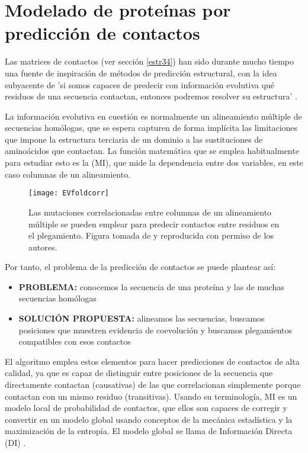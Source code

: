 \section{Modelado de prote\'{i}nas por predicci\'{o}n de contactos} \label{contactosPred}

Las matrices de contactos (ver secci\'{o}n \ref{estr34})  han sido durante mucho tiempo una fuente de inspiraci\'{o}n de m\'{e}todos 
de predicci\'{o}n estructural, con la idea subyacente de 'si somos capaces de predecir con informaci\'{o}n evolutiva qu\'{e} residuos de 
una secuencia contactan, entonces podremos resolver su estructura' \citep{Gobel1994,deJuan2013}.

La informaci\'{o}n evolutiva en cuesti\'{o}n es normalmente un alineamiento m\'{u}ltiple de secuencias hom\'{o}logas, que se espera
capturen de forma impl\'{i}cita las limitaciones que impone la estructura terciaria de un dominio a las sustituciones de amino\'{a}cidos
que contactan. La funci\'{o}n matem\'{a}tica que se emplea habitualmente para estudiar esto es la 
 (MI), 
que mide la dependencia entre dos variables, en este caso columnas de un alineamiento.

\begin{figure}
\begin{center} 
\texttt{[image: EVfoldcorr]}
\caption%
{
Las mutaciones correlacionadas entre columnas de un alineamiento m\'{u}ltiple se pueden emplear para predecir contactos entre residuos en el plegamiento.
Figura tomada de \cite{Marks2011} y reproducida con permiso de los autores.
}
\label{fig:EVfold1}
\end{center}
\end{figure}

Por tanto, el problema de la predicci\'{o}n de contactos se puede plantear as\'{i}:
\begin{itemize}
\item \textbf{PROBLEMA:} conocemos la secuencia de una prote\'{i}na y las de muchas secuencias hom\'{o}logas
\item \textbf{SOLUCI\'{O}N PROPUESTA:} alineamos las secuencias, buscamos posiciones que muestren evidencia de coevoluci\'{o}n 
y buscamos plegamientos compatibles con esos contactos
\end{itemize}

El algoritmo  %
emplea estos elementos
para hacer predicciones de contactos de alta calidad, ya que es capaz de distinguir entre posiciones de la secuencia
que directamente contactan (causativas) de las que correlacionan simplemente porque contactan con un mismo residuo (transitivas). 
Usando su terminolog\'{i}a,
MI es un modelo local de probabilidad de contactos, que ellos son capaces de corregir y convertir en un modelo global usando conceptos 
de la mec\'{a}nica estad\'{i}stica y la maximizaci\'{o}n de la entrop\'{i}a. El modelo global se llama de Informaci\'{o}n Directa (DI)
\citep{Marks2011}.

